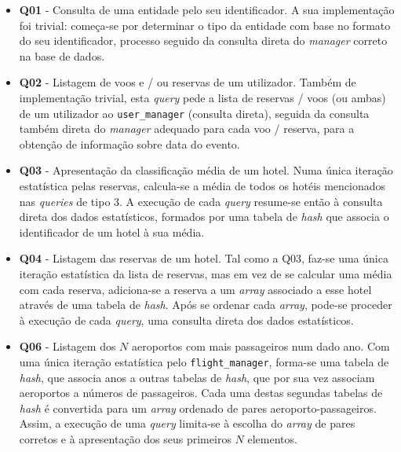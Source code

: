 \documentclass[12pt, a4paper]{article}
\begin{document}
\begin{itemize}
    \item \textbf{Q01} - Consulta de uma entidade pelo seu identificador. A sua implementação foi
                         trivial: começa-se por determinar o tipo da entidade com base no formato
                         do seu identificador, processo seguido da consulta direta do \emph{manager}
                         correto na base de dados.

    \item \textbf{Q02} - Listagem de voos e / ou reservas de um utilizador. Também de implementação
                         trivial, esta \emph{query} pede a lista de reservas / voos (ou ambas) de um
                         utilizador ao \texttt{user\_manager} (consulta direta), seguida da consulta
                         também direta do \emph{manager} adequado para cada voo / reserva, para a
                         obtenção de informação sobre data do evento.

    \item \textbf{Q03} - Apresentação da classificação média de um hotel. Numa única iteração
                         estatística pelas reservas, calcula-se a média de todos os hotéis
                         mencionados nas \emph{queries} de tipo 3. A execução de cada \emph{query}
                         resume-se então à consulta direta dos dados estatísticos, formados por uma
                         tabela de \emph{hash} que associa o identificador de um hotel à sua média.

    \item \textbf{Q04} - Listagem das reservas de um hotel. Tal como a Q03, faz-se uma única
                         iteração estatística da lista de reservas, mas em vez de se calcular uma
                         média com cada reserva, adiciona-se a reserva a um \emph{array} associado
                         a esse hotel através de uma tabela de \emph{hash}. Após se ordenar cada
                         \emph{array}, pode-se proceder à execução de cada \emph{query}, uma
                         consulta direta dos dados estatísticos.

    \item \textbf{Q06} - Listagem dos $N$ aeroportos com mais passageiros num dado ano. Com uma
                         única iteração estatística pelo \texttt{flight\_manager}, forma-se uma
                         tabela de \emph{hash}, que associa anos a outras tabelas de \emph{hash},
                         que por sua vez associam aeroportos a números de passageiros. Cada uma
                         destas segundas tabelas de \emph{hash} é convertida para um \emph{array}
                         ordenado de pares aeroporto-passageiros. Assim, a execução de uma
                         \emph{query} limita-se à escolha do \emph{array} de pares corretos e à
                         apresentação dos seus primeiros $N$ elementos.


\end{itemize}
\end{document}
